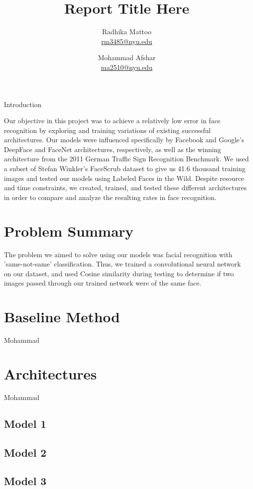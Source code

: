 \documentclass[11pt]{article}
\title{Report Title Here}
\author{Radhika Mattoo \\ \href{mailto:rm3485@nyu.edu}{rm3485@nyu.edu}
   \and Mohammad Afshar \\ \href{mailto:ma2510@nyu.edu}{ma2510@nyu.edu} }
\begin{document}
\maketitle
\newcommand{\slugmaster}


\section{Introduction}
\par
Our objective in this project was to achieve a relatively low error in face recognition by exploring and training variations of existing successful architectures. Our models were influenced specifically by Facebook and Google's DeepFace and FaceNet architectures, respectively, as well as the winning architecture from the 2011 German Traffic Sign Recognition Benchmark. We used a subset of Stefan Winkler's FaceScrub dataset to give us 41.6 thousand training images and tested our models using Labeled Faces in the Wild. Despite resource and time constraints, we created, trained, and tested these different architectures in order to compare and analyze the resulting rates in face recognition.
\section{Problem Summary}
    \par
    The problem we aimed to solve using our models was facial recognition with 'same-not-same' classification. Thus, we trained a convolutional neural network on our dataset, and used Cosine similarity during testing to determine if two images passed through our trained network were of the same face. 
\section{Baseline Method} Mohammad
\section{Architectures} Mohammad
    \subsection{Model 1}
    \subsection{Model 2}
    \subsection{Model 3}
\end{document}
